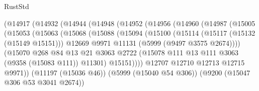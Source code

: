 \begin{lexlean}{RustStd}
\begin{coremodule}
                          (@14917
                            (@14932
                              (@14944
                                (@14948
                                  (@14952
                                    (@14956
                                      (@14960
                                        (@14987
                                          (@15005
                                            (@15053
                                              (@15063
                                                (@15068
                                                  (@15088
                                                    (@15094
                                                      (@15100
                                                        (@15114
                                                          (@15117 (@15132 (@15149 @15151)))
                                                          @12669
                                                          @9971
                                                          @11131
                                                          (@5999 (@9497 @3575 @2674))))
                                                      (@15070
                                                        @268
                                                        @84
                                                        @13
                                                        @21
                                                        @3063
                                                        @2722
                                                        (@15078
                                                          @111
                                                          @13
                                                          @111
                                                          @3063
                                                          (@9358 (@15083 @111))
                                                          @11301)
                                                        @15151))))
                                                @12707
                                                @12710
                                                @12713
                                                @12715
                                                @9971))
                                            (@11197 (@15036 @46))
                                            (@5999 (@15040 @54 @306))
                                            (@9200 (@15047 @306 @53 @3041 @2674))

\end{coremodule}
\end{lexlean}
